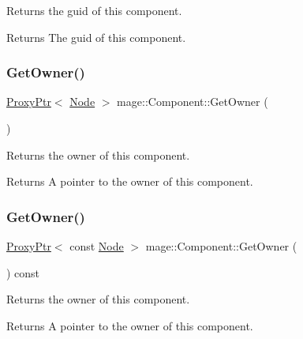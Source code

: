Returns the guid of this component.

\begin{DoxyReturn}{Returns}
The guid of this component. 
\end{DoxyReturn}
\mbox{\label{classmage_1_1_component_af6261b2a7688dd5a078a917e1ec69e0b}} 
\subsubsection{\texorpdfstring{Get\+Owner()}{GetOwner()}\hspace{0.1cm}{\footnotesize\ttfamily [1/2]}}
{\footnotesize\ttfamily \mbox{\hyperlink{classmage_1_1_proxy_ptr}{Proxy\+Ptr}}$<$ \mbox{\hyperlink{classmage_1_1_node}{Node}} $>$ mage\+::\+Component\+::\+Get\+Owner (\begin{DoxyParamCaption}{ }\end{DoxyParamCaption})\hspace{0.3cm}{\ttfamily [noexcept]}}

Returns the owner of this component.

\begin{DoxyReturn}{Returns}
A pointer to the owner of this component. 
\end{DoxyReturn}
\mbox{\label{classmage_1_1_component_a97f402d0f75eff5a893abd2821a5335d}} 
\subsubsection{\texorpdfstring{Get\+Owner()}{GetOwner()}\hspace{0.1cm}{\footnotesize\ttfamily [2/2]}}
{\footnotesize\ttfamily \mbox{\hyperlink{classmage_1_1_proxy_ptr}{Proxy\+Ptr}}$<$ const \mbox{\hyperlink{classmage_1_1_node}{Node}} $>$ mage\+::\+Component\+::\+Get\+Owner (\begin{DoxyParamCaption}{ }\end{DoxyParamCaption}) const\hspace{0.3cm}{\ttfamily [noexcept]}}

Returns the owner of this component.

\begin{DoxyReturn}{Returns}
A pointer to the owner of this component. 
\end{DoxyReturn}
\mbox{\label{classmage_1_1_component_a56f63648ba479decbba4a6fbaa544b4d}} 
